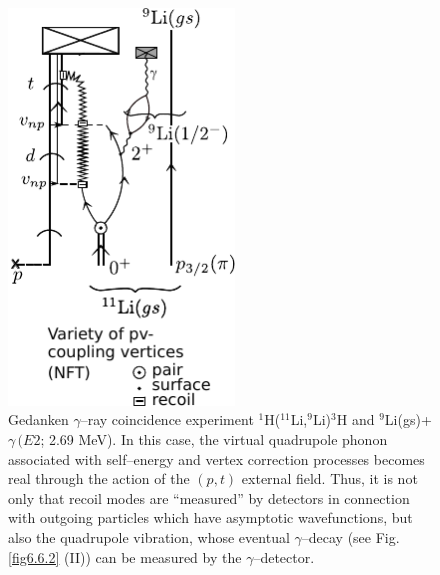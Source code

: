           \begin{figure}
          \centerline {
          \includegraphics*[width=6cm]{introduccion/figs/figintro6xxx}
          }
          \caption{Gedanken $\gamma$--ray coincidence experiment $^1$H($^{11}$Li,$^9$Li)$^3$H and $^9$Li(gs)+$\gamma\, (E2$; 2.69 MeV). In  this case, the virtual quadrupole phonon associated with self--energy and vertex correction processes becomes real through the action of the $(p,t)$ external field. Thus, it is not only that recoil modes are ``measured'' by  detectors in connection with outgoing particles which have  asymptotic wavefunctions, but also the quadrupole vibration, whose eventual $\gamma$--decay (see Fig. \ref{fig6.6.2} (II)) can be  measured by the $\gamma$--detector. }
          \label{figintro6x}
          \end{figure}
